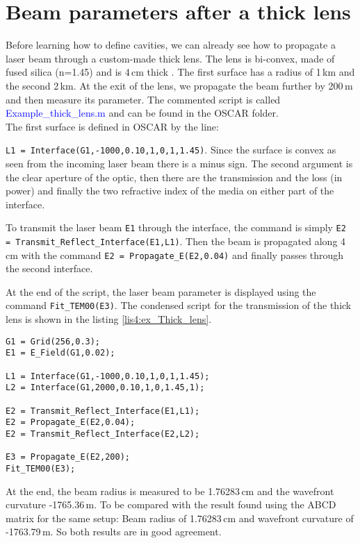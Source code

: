 \section{Beam parameters after a thick lens}

Before learning how to define cavities, we can already see how to propagate a laser beam through a custom-made thick lens. The lens is bi-convex, made of fused silica (n=1.45) and is 4\,cm thick . The first surface has a radius of 1\,km and the second 2\,km. At the exit of the lens, we propagate the beam further by 200\,m and then measure its parameter. The commented script is called \textcolor{blue}{Example\_thick\_lens.m} and can be found in the OSCAR folder.\\

The first surface is defined in OSCAR by the line:

\noindent \verb|L1 = Interface(G1,-1000,0.10,1,0,1,1.45)|. Since the surface is convex as seen from the incoming laser beam there is a minus sign. The second argument is the clear aperture of the optic, then there are the transmission and the loss (in power) and finally the two refractive index of the media on either part of the interface.

To transmit the laser beam \verb|E1| through the interface, the command is simply \verb|E2 = Transmit_Reflect_Interface(E1,L1)|. Then the beam is propagated along 4\,cm with the command \verb|E2 = Propagate_E(E2,0.04)| and finally passes through the second interface.

At the end of the script, the laser beam parameter is displayed using the command \verb|Fit_TEM00(E3)|. The condensed script for the transmission of the thick lens is shown in the listing \ref{lis4:ex_Thick_lens}.\\

\begin{lstlisting}[float=htp,caption=Example of OSCAR script to simulate a thick lens\label{lis4:ex_Thick_lens},frame=lines]
G1 = Grid(256,0.3);
E1 = E_Field(G1,0.02);

L1 = Interface(G1,-1000,0.10,1,0,1,1.45);
L2 = Interface(G1,2000,0.10,1,0,1.45,1);

E2 = Transmit_Reflect_Interface(E1,L1);
E2 = Propagate_E(E2,0.04);
E2 = Transmit_Reflect_Interface(E2,L2);

E3 = Propagate_E(E2,200);
Fit_TEM00(E3);
\end{lstlisting}

At the end, the beam radius is measured to be 1.76283\,cm and the wavefront curvature -1765.36\,m. To be compared with the result found using the ABCD matrix for the same setup: Beam radius of 1.76283\,cm and wavefront curvature of -1763.79\,m. So both results are in good agreement.

